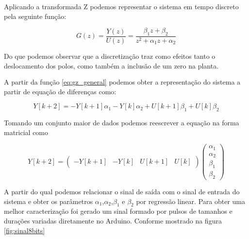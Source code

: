 \documentclass[a4paper,11pt]{article}
\begin{document}


Aplicando a transformada Z podemos representar o sistema em tempo discreto pela seguinte função:

\begin{equation}\label{eq:gz_general}
    G(z) = \frac{Y(z)}{U(z)} = \frac{\beta_1 z + \beta_2}{z^2 + \alpha_1 z + \alpha_2}
\end{equation}

Do que podemos observar que a discretização traz como efeitos tanto o deslocamento dos polos, como também a inclusão de um zero na planta.

A partir da função \ref{eq:gz_general} podemos obter a representação do sistema a partir de equação de diferenças como:

\begin{equation}\label{eq:gz_general}
  Y[k+2] = -Y[k+1]\alpha_1 - Y[k]\alpha_2 + U[k+1]\beta_1 + U[k]\beta_2
\end{equation}

Tomando um conjunto maior de dados podemos reescrever a equação na forma matricial como

\begin{equation}\label{eq:gz_general}
  Y[k+2] = 
  \left( \begin{array}{cccc}
  -Y[k+1] & -Y[k] & U[k+1] & U[k]
  \end{array} \right)
  \left(\begin{array}{c}
    \alpha_1\\ \alpha_2 \\ \beta_1 \\ \beta_2
  \end{array}\right)
\end{equation}

A partir do qual podemos relacionar o sinal de saída com o sinal de entrada do sistema e obter os parâmetros $\alpha_1$,$\alpha_2$,$\beta_1$ e $\beta_2$ por regressão linear. Para obter uma melhor caracterização foi gerado um sinal formado por pulsos de tamanhos e durações variadas diretamente no Arduino.  Conforme mostrado na figura \ref{fig:sinal8bits}
\end{document}
